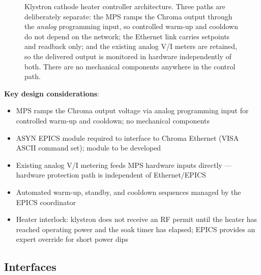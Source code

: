 \begin{figure}[tbp]
\centering
\begin{fitpicture}\end{fitpicture}
\caption{Klystron cathode heater controller architecture.  Three paths are deliberately separate: the MPS ramps the Chroma output through the \emph{analog} programming input, so controlled warm-up and cooldown do not depend on the network; the Ethernet link carries setpoints and readback only; and the existing analog V/I meters are retained, so the delivered output is monitored in hardware independently of both.  There are no mechanical components anywhere in the control path.}\label{fig:heater-architecture}
\end{figure}
\textbf{Key design considerations}:

\begin{itemize}
\tightlist
\item
  MPS ramps the Chroma output voltage via analog programming input for controlled warm-up and cooldown; no mechanical components
\item
  ASYN EPICS module required to interface to Chroma Ethernet (VISA ASCII command set); module to be developed
\item
  Existing analog V/I metering feeds MPS hardware inputs directly --- hardware protection path is independent of Ethernet/EPICS
\item
  Automated warm-up, standby, and cooldown sequences managed by the EPICS coordinator
\item
  Heater interlock: klystron does not receive an RF permit until the heater has reached operating power and the soak timer has elapsed; EPICS provides an expert override for short power dips
\end{itemize}

\subsection{Interfaces}\label{interfaces-3}

